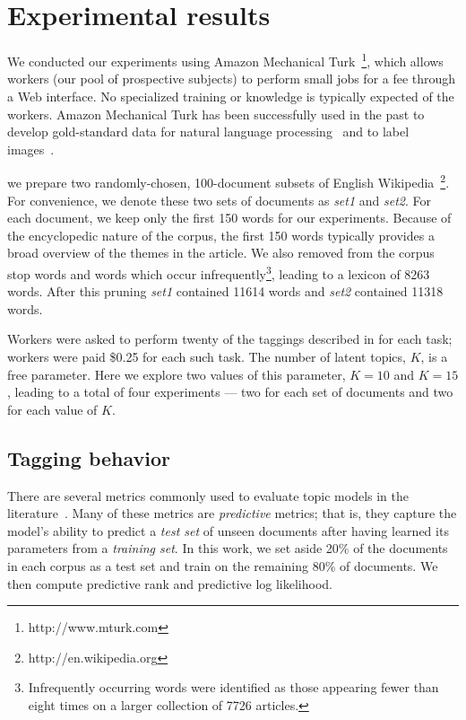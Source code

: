 \section{Experimental results}
\label{sec:experiments}

We conducted our experiments using Amazon Mechanical
Turk~\footnote{http://www.mturk.com}, which allows workers (our pool
of prospective subjects) to perform small jobs for a fee through a Web
interface.  No specialized training or knowledge is typically expected
of the workers.  Amazon Mechanical Turk has been successfully used in
the past to develop gold-standard data for natural language
processing~\cite{snow-08} and to label images~\cite{imagenet-cvpr09}.

we prepare two randomly-chosen, 100-document subsets of English
Wikipedia~\footnote{http://en.wikipedia.org}.  For convenience, we
denote these two sets of documents as \emph{set1} and \emph{set2}.
For each document, we keep only the first 150 words for our
experiments.  Because of the encyclopedic nature of the corpus, the
first 150 words typically provides a broad overview of the themes in
the article.  We also removed from the corpus stop words and words
which occur infrequently\footnote{Infrequently occurring words were
  identified as those appearing fewer than eight times on a larger
  collection of 7726 articles.}, leading to a lexicon of 8263 words.
After this pruning \emph{set1} contained 11614 words and \emph{set2}
contained 11318 words.

Workers were asked to perform twenty of the taggings described in
 for each task; workers were paid \$0.25 for each
such task.  The number of latent topics, $K$, is a free parameter.
Here we explore two values of this parameter, $K=10$ and $K=15$,
leading to a total of four experiments --- two for each set of
documents and two for each value of $K$.

\subsection{Tagging behavior}

There are several metrics commonly used to evaluate topic models in
the literature~\cite{wallach-09}.  Many of these metrics are
\emph{predictive} metrics; that is, they capture the model's ability
to predict a \emph{test set} of unseen documents after having learned
its parameters from a \emph{training set}.  In this work, we set aside
20\% of the documents in each corpus as a test set and train on the
remaining 80\% of documents.  We then compute predictive rank and
predictive log likelihood.

